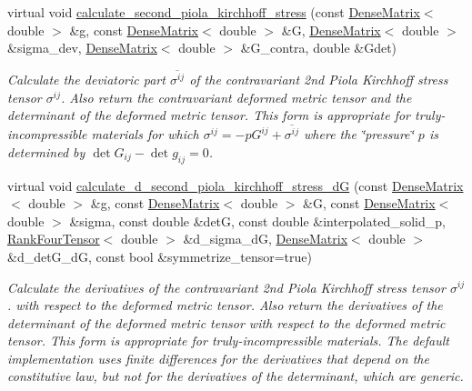 \begin{DoxyCompactItemize}
virtual void \hyperlink{classoomph_1_1ConstitutiveLaw_ac8178b1b7cd7e6a64942dba9e0997b30}{calculate\+\_\+second\+\_\+piola\+\_\+kirchhoff\+\_\+stress} (const \hyperlink{classoomph_1_1DenseMatrix}{Dense\+Matrix}$<$ double $>$ \&g, const \hyperlink{classoomph_1_1DenseMatrix}{Dense\+Matrix}$<$ double $>$ \&G, \hyperlink{classoomph_1_1DenseMatrix}{Dense\+Matrix}$<$ double $>$ \&sigma\+\_\+dev, \hyperlink{classoomph_1_1DenseMatrix}{Dense\+Matrix}$<$ double $>$ \&G\+\_\+contra, double \&Gdet)
\begin{DoxyCompactList}\small\item\em Calculate the deviatoric part $ \overline{ \sigma^{ij}}$ of the contravariant 2nd Piola Kirchhoff stress tensor $ \sigma^{ij}$. Also return the contravariant deformed metric tensor and the determinant of the deformed metric tensor. This form is appropriate for truly-\/incompressible materials for which $ \sigma^{ij} = - p G^{ij} +\overline{ \sigma^{ij}} $ where the \char`\"{}pressure\char`\"{} $ p $ is determined by $ \det G_{ij} - \det g_{ij} = 0 $. \end{DoxyCompactList}\item 
virtual void \hyperlink{classoomph_1_1ConstitutiveLaw_af13f9d05db09870d1b90b7ef389bdb71}{calculate\+\_\+d\+\_\+second\+\_\+piola\+\_\+kirchhoff\+\_\+stress\+\_\+dG} (const \hyperlink{classoomph_1_1DenseMatrix}{Dense\+Matrix}$<$ double $>$ \&g, const \hyperlink{classoomph_1_1DenseMatrix}{Dense\+Matrix}$<$ double $>$ \&G, const \hyperlink{classoomph_1_1DenseMatrix}{Dense\+Matrix}$<$ double $>$ \&sigma, const double \&detG, const double \&interpolated\+\_\+solid\+\_\+p, \hyperlink{classoomph_1_1RankFourTensor}{Rank\+Four\+Tensor}$<$ double $>$ \&d\+\_\+sigma\+\_\+dG, \hyperlink{classoomph_1_1DenseMatrix}{Dense\+Matrix}$<$ double $>$ \&d\+\_\+det\+G\+\_\+dG, const bool \&symmetrize\+\_\+tensor=true)
\begin{DoxyCompactList}\small\item\em Calculate the derivatives of the contravariant 2nd Piola Kirchhoff stress tensor $ \sigma^{ij}$. with respect to the deformed metric tensor. Also return the derivatives of the determinant of the deformed metric tensor with respect to the deformed metric tensor. This form is appropriate for truly-\/incompressible materials. The default implementation uses finite differences for the derivatives that depend on the constitutive law, but not for the derivatives of the determinant, which are generic. \end{DoxyCompactList}\item 

\end{DoxyCompactItemize}
